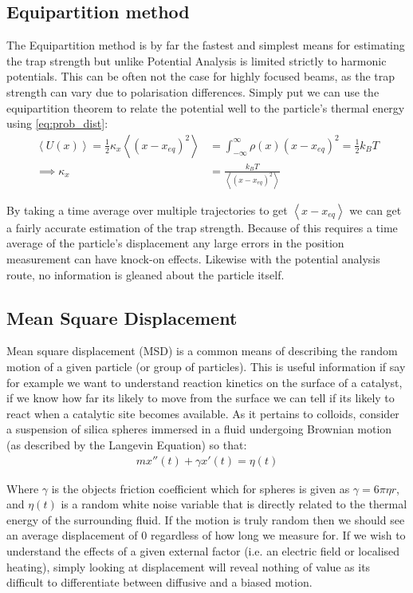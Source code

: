 \subsection{Equipartition method}
The Equipartition method is by far the fastest and simplest means 
for estimating the trap strength but unlike Potential Analysis is 
limited strictly to harmonic potentials. This can be often not the 
case for highly focused beams, as the trap strength can vary due to 
polarisation differences. Simply put we can use the equipartition 
theorem to relate the potential well to the particle's thermal 
energy using \eqref{eq:prob_dist}:
\begin{align}
	\left<U(x)\right> = \frac{1}{2}\kappa_x\left<(x-x_{eq})^2\right> &= \int_{-\infty}^{\infty}\rho(x)(x-x_{eq})^2 = \frac{1}{2}k_BT \\
	\implies \kappa_x &= \frac{k_BT}{\left<(x-x_{eq})^2\right>} 
\end{align}

By taking a time average over multiple trajectories to get 
$\left<x-x_{eq}\right>$ we can get a fairly accurate estimation 
of the trap strength. Because of this requires a time average of 
the particle's displacement any large errors in the position 
measurement can have knock-on effects. Likewise with the potential 
analysis route, no information is gleaned about the particle itself.

\subsection{Mean Square Displacement}
Mean square displacement (MSD) is a common means of describing 
the random motion of a given particle (or group of particles). 
This is useful information if say for example we want to understand 
reaction kinetics on the surface of a catalyst, if we know how 
far its likely to move from the surface we can tell if its likely 
to react when a catalytic site becomes available. As it pertains 
to colloids, consider a suspension of silica spheres immersed in 
a fluid undergoing Brownian motion (as described by the Langevin 
Equation) so that:
\begin{align}
	mx''(t) + \gamma x'(t) = \eta(t)
\end{align}

Where $\gamma$ is the objects friction coefficient which for spheres 
is given as $\gamma = 6\pi\eta r$, and $\eta(t)$ is a random white 
noise variable that is directly related to the thermal energy of 
the surrounding fluid. If the motion is truly random then we should 
see an average displacement of 0 regardless of how long we measure 
for. If we wish to understand the effects of a given external factor 
(i.e. an electric field or localised heating), simply looking at 
displacement will reveal nothing of value as its difficult to 
differentiate between diffusive and a biased motion. 

